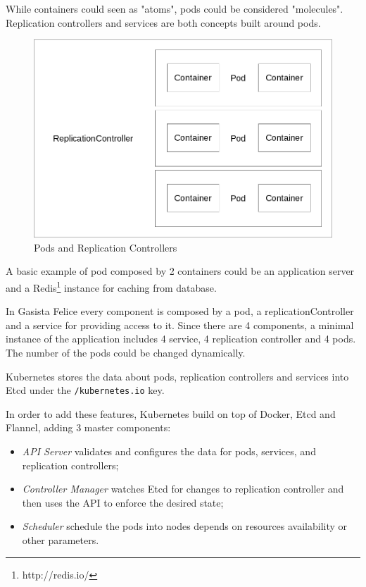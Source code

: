 While containers could seen as "atoms", pods could be considered "molecules".  Replication controllers and services are both concepts built around pods.

\begin{figure}[htbp]
\centering
\includegraphics{media/ch5-pods-rcs.png}
\caption{Pods and Replication Controllers}
\end{figure}

A basic example of pod composed by 2 containers could be an application server and a Redis\footnote{http://redis.io/} instance for caching from database.

In Gasista Felice every component is composed by a pod, a replicationController and a service for providing access to it.  Since there are 4 components, a minimal instance of the application includes 4 service, 4 replication controller and 4 pods.  The number of the pods could be changed dynamically.

Kubernetes stores the data about pods, replication controllers and services into Etcd under the \texttt{/kubernetes.io} key.

In order to add these features, Kubernetes build on top of Docker, Etcd and Flannel, adding 3 master components:

\begin{itemize}
\item \textit{API Server} validates and configures the data for pods, services, and replication controllers;
\item \textit{Controller Manager} watches Etcd for changes to replication controller and then uses the API to enforce the desired state;
\item \textit{Scheduler} schedule the pods into nodes depends on resources availability or other parameters.
\end{itemize}

